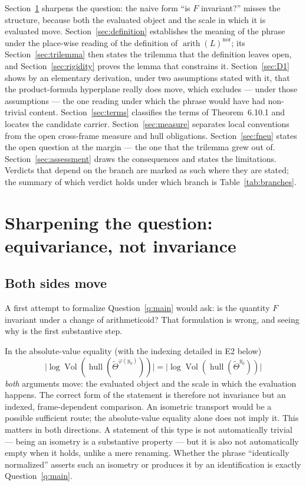 \documentclass[11pt,a4paper]{article}
\theoremstyle{definition}
\theoremstyle{plain}
\theoremstyle{definition}
\newcommand{\arith}{\operatorname{arith}}
\newcommand{\Vol}{\operatorname{Vol}}
\newcommand{\Thet}{\widetilde{\Theta}}
\begin{document}
Section~\ref{sec:equivariance} sharpens the question: the naive form ``is $F$
invariant?'' misses the structure, because both the evaluated object and the scale
in which it is evaluated move. Section~\ref{sec:definition} establishes the meaning
of the phrase under the place-wise reading of the definition of
$\arith(L)^{\mathrm{nor}}$; its
Section~\ref{sec:trilemma} then states the trilemma that the definition leaves
open, and Section~\ref{sec:rigidity} proves the lemma that constrains it.
Section~\ref{sec:D1} shows by an elementary derivation, under two assumptions
stated with it, that the product-formula hyperplane really does move, which
excludes --- under those assumptions --- the one reading under which the phrase
would have had non-trivial content.
Section~\ref{sec:terms} classifies the terms of Theorem~6.10.1 and locates the
candidate carrier. Section~\ref{sec:measure} separates local conventions from
the open cross-frame measure and hull obligations. Section~\ref{sec:fneu} states the open question at
the margin --- the one that the trilemma grew out of.
Section~\ref{sec:assessment} draws the consequences and states the limitations.
Verdicts that depend on the branch are marked as such where they are stated; the
summary of which verdict holds under which branch is Table~\ref{tab:branches}.

\section{Sharpening the question: equivariance, not invariance}
\label{sec:equivariance}

\subsection{Both sides move}

A first attempt to formalize Question~\ref{q:main} would ask: is the quantity $F$
invariant under a change of arithmeticoid? That formulation is wrong, and seeing
why is the first substantive step.

In the absolute-value equality (with the indexing detailed in E2 below)
\[
 \bigl|\log\Vol(\operatorname{hull}(\Thet^{\varphi(y_0)}))\bigr|
 =\bigl|\log\Vol(\operatorname{hull}(\Thet^{y_0}))\bigr|
\]
\emph{both} arguments move: the evaluated object and the scale in which the
evaluation happens. The correct form of the statement is therefore not invariance
but an indexed, frame-dependent comparison. An isometric transport would be
 a possible sufficient route; the absolute-value equality alone does not imply it. This matters in
both directions. A statement of this type is not automatically trivial --- being
an isometry is a substantive property --- but it is also not automatically empty
when it holds, unlike a mere renaming. Whether the phrase ``identically
normalized'' asserts such an isometry or produces it by an identification is
exactly Question~\ref{q:main}.
\end{document}

